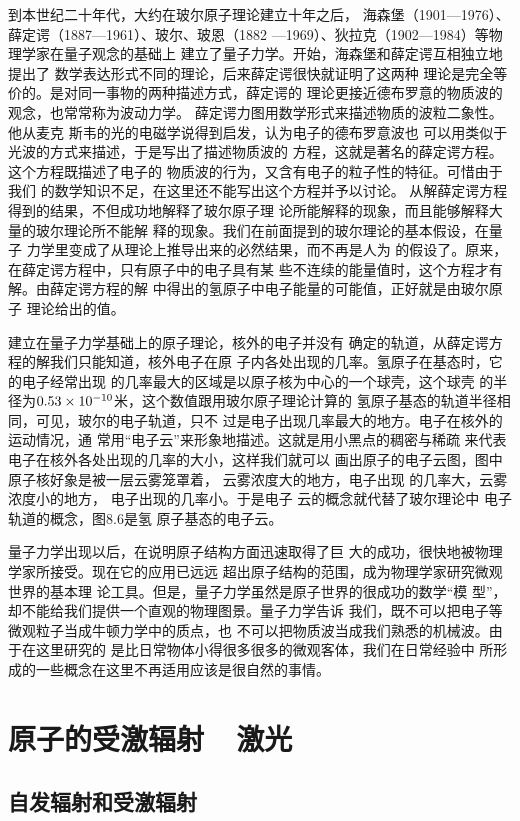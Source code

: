 到本世纪二十年代，大约在玻尔原子理论建立十年之后，
海森堡（1901—1976）、薛定谔（1887—1961）、玻尔、玻恩（1882
—1969）、狄拉克（1902—1984）等物理学家在量子观念的基础上
建立了量子力学。开始，海森堡和薛定谔互相独立地提出了
数学表达形式不同的理论，后来薛定谔很快就证明了这两种
理论是完全等价的。是对同一事物的两种描述方式，薛定谔的
理论更接近德布罗意的物质波的观念，也常常称为波动力学。
薛定谔力图用数学形式来描述物质的波粒二象性。他从麦克
斯韦的光的电磁学说得到启发，认为电子的德布罗意波也
可以用类似于光波的方式来描述，于是写出了描述物质波的
方程，这就是著名的薛定谔方程。这个方程既描述了电子的
物质波的行为，又含有电子的粒子性的特征。可惜由于我们
的数学知识不足，在这里还不能写出这个方程并予以讨论。
从解薛定谔方程得到的结果，不但成功地解释了玻尔原子理
论所能解释的现象，而且能够解释大量的玻尔理论所不能解
释的现象。我们在前面提到的玻尔理论的基本假设，在量子
力学里变成了从理论上推导出来的必然结果，而不再是人为
的假设了。原来，在薛定谔方程中，只有原子中的电子具有某
些不连续的能量值时，这个方程才有解。由薛定谔方程的解
中得出的氢原子中电子能量的可能值，正好就是由玻尔原子
理论给出的值。

建立在量子力学基础上的原子理论，核外的电子并没有
确定的轨道，从薛定谔方程的解我们只能知道，核外电子在原
子内各处出现的几率。氢原子在基态时，它的电子经常出现
的几率最大的区域是以原子核为中心的一个球壳，这个球壳
的半径为$0.53\times10^{-10}$米，这个数值跟用玻尔原子理论计算的
氢原子基态的轨道半径相同，可见，玻尔的电子轨道，只不
过是电子出现几率最大的地方。电子在核外的运动情况，通
常用“电子云”来形象地描述。这就是用小黑点的稠密与稀疏
来代表电子在核外各处出现的几率的大小，这样我们就可以
画出原子的电子云图，图中原子核好象是被一层云雾笼罩着，
云雾浓度大的地方，电子出现
的几率大，云雾浓度小的地方，
电子出现的几率小。于是电子
云的概念就代替了玻尔理论中
电子轨道的概念，图8.6是氢
原子基态的电子云。


量子力学出现以后，在说明原子结构方面迅速取得了巨
大的成功，很快地被物理学家所接受。现在它的应用已远远
超出原子结构的范围，成为物理学家研究微观世界的基本理
论工具。但是，量子力学虽然是原子世界的很成功的数学“模
型”，却不能给我们提供一个直观的物理图景。量子力学告诉
我们，既不可以把电子等微观粒子当成牛顿力学中的质点，也
不可以把物质波当成我们熟悉的机械波。由于在这里研究的
是比日常物体小得很多很多的微观客体，我们在日常经验中
所形成的一些概念在这里不再适用应该是很自然的事情。


\section{原子的受激辐射~~激光}
\subsection{自发辐射和受激辐射}

